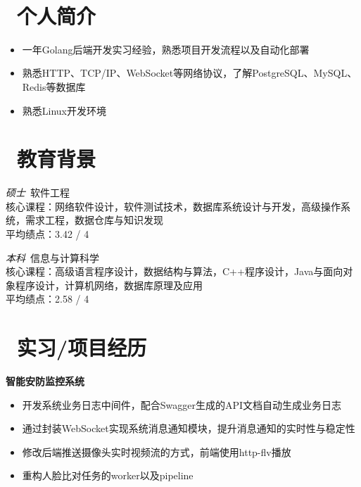 \documentclass{resume}
\begin{document}


  \centerline { \textperiodcentered\ 
  }

\section{\faUsers\ 个人简介}
\begin{itemize}
  \item 一年Golang后端开发实习经验，熟悉项目开发流程以及自动化部署
  \item 熟悉HTTP、TCP/IP、WebSocket等网络协议，了解PostgreSQL、MySQL、Redis等数据库
  \item 熟悉Linux开发环境
\end{itemize}

\section{\faGraduationCap\ 教育背景}
\textit{硕士}\ 软件工程
\\核心课程：网络软件设计，软件测试技术，数据库系统设计与开发，高级操作系统，需求工程，数据仓库与知识发现
\\平均绩点：3.42 / 4

\textit{本科}\ 信息与计算科学
\\核心课程：高级语言程序设计，数据结构与算法，C++程序设计，Java与面向对象程序设计，计算机网络，数据库原理及应用
\\平均绩点：2.58 / 4


\section{\faBriefcase\ 实习/项目经历}
\textbf{智能安防监控系统}
\begin{itemize}
  \item 开发系统业务日志中间件，配合Swagger生成的API文档自动生成业务日志
  \item 通过封装WebSocket实现系统消息通知模块，提升消息通知的实时性与稳定性
  \item 修改后端推送摄像头实时视频流的方式，前端使用http-flv播放
  \item 重构人脸比对任务的worker以及pipeline
\end{itemize}
\end{document}
